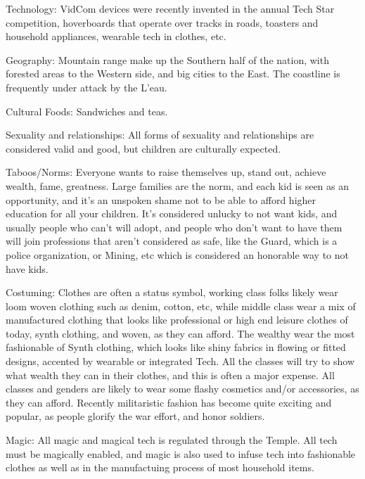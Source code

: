 \documentclass[blue]{GL2020}
\begin{document}
Technology:		VidCom devices were recently invented in the annual Tech Star competition, hoverboards that operate over tracks in roads, toasters and household appliances, wearable tech in clothes, etc.  

Geography:	Mountain range make up the Southern half of the nation, with forested areas to the Western side, and big cities to the East. The coastline is frequently under attack by the L'eau.

Cultural Foods:	Sandwiches and teas.

Sexuality and relationships:	All forms of sexuality and relationships are considered valid and good, but children are culturally expected.

Taboos/Norms:		Everyone wants to raise themselves up, stand out, achieve wealth, fame, greatness.  Large families are the norm, and each kid is seen as an opportunity, and it's an unspoken shame not to be able to afford higher education for all your children.  It's considered unlucky to not want kids, and usually people who can't will adopt, and people who don't want to have them will join professions that aren't considered as safe, like the Guard, which is a police organization, or Mining, etc which is considered an honorable way to not have kids.

Costuming:		Clothes are often a status symbol, working class folks likely wear loom woven clothing such as denim, cotton, etc, while middle class wear a mix of manufactured clothing that looks like professional or high end leisure clothes of today, synth clothing, and woven, as they can afford.  The wealthy wear the most fashionable of Synth clothing, which looks like shiny fabrics in flowing or fitted designs, accented by wearable or integrated Tech.  All the classes will try to show what wealth they can in their clothes, and this is often a major expense.  All classes and genders are likely to wear some flashy cosmetics and/or accessories, as they can afford.  Recently militaristic fashion has become quite exciting and popular, as people glorify the war effort, and honor soldiers.

Magic:	All magic and magical tech is regulated through the Temple.  All tech must be magically enabled, and
magic is also used to infuse tech into fashionable clothes as well as in the manufactuing process of most household items.
									
\end{document}
